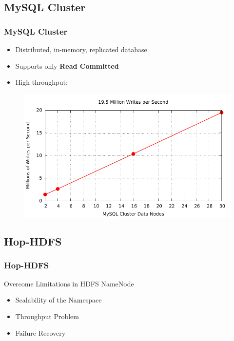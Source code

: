 \documentclass{beamer}
\begin{document}
\subsection{MySQL Cluster}
\begin{frame}
	\frametitle{MySQL Cluster}
	\begin{itemize}
		\item Distributed, in-memory, replicated database
		\item Supports only \textbf{Read Committed}
		\item High throughput:
	\end{itemize}
\begin{figure}[h!]
	\centering
	\includegraphics[scale=0.7]{figs/mysqlclusterbenchmark.pdf}
\end{figure}
\end{frame}

\subsection{Hop-HDFS}
\begin{frame}
	\frametitle{Hop-HDFS}
		\begin{block}{Overcome Limitations in HDFS NameNode}
			\begin{itemize}
				\item Scalability of the Namespace  
				\item Throughput Problem
				\item Failure Recovery
			\end{itemize}
		\end{block}
\end{frame}
\end{document}
